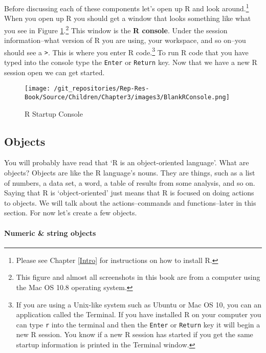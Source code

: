 Before discussing each of these components let's open up R and look around.\footnote{Please see Chapter \ref{Intro} for instructions on how to install R.} When you open up R you should get a window that looks something like what you see in Figure \ref{RBlankMain}.\footnote{This figure and almost all screenshots in this book are from a computer using the Mac OS 10.8 operating system.} This window is the {\bf{R console}}. Under the session information--what version of R you are using, your workspace, and so on--you should see a {\tt{\textgreater}}. This is where you enter R code.\footnote{If you are using a Unix-like system such as Ubuntu or Mac OS 10, you can an application called the Terminal. If you have installed R on your computer you can type {\tt{r}} into the terminal and then the {\tt{Enter}} or {\tt{Return}} key it will begin a new R session. You know if a new R session has started if you get the same startup information is printed in the Terminal window.} To run R code that you have typed into the console type the {\tt{Enter}} or {\tt{Return}} key. Now that we have a new R session open we can get started. 

\begin{figure}[th!]
    \caption{R Startup Console}
    \label{RBlankMain}
    \begin{center}
    \texttt{[image: /git\_repositories/Rep-Res-Book/Source/Children/Chapter3/images3/BlankRConsole.png]}
    \end{center}
\end{figure}

\subsection{Objects}

You will probably have read that `R is an object-oriented language'.  What are objects? Objects are like the R language's nouns. They are things, such as a list of numbers, a data set, a word, a table of results from some analysis, and so on. Saying that R is `object-oriented' just means that R is focused on doing actions to objects. We will talk about the actions--commands and functions--later in this section. For now let's create a few objects.

\paragraph{Numeric \& string objects}


